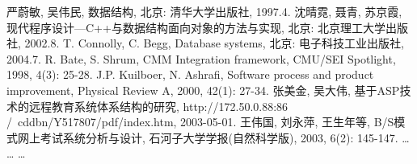 \documentclass[../../main.tex]{subfiles}
\begin{document}
%
















\pagestyle{afterbody}
{}

\begin{thebibliography}{99}

 严蔚敏, 吴伟民, 数据结构, 北京: 清华大学出版社, 1997.4.
 沈晴霓, 聂青, 苏京霞, 现代程序设计—C++与数据结构面向对象的方法与实现, 北京: 北京理工大学出版社, 2002.8.
 T. Connolly, C. Begg, Database systems, 北京: 电子科技工业出版社, 2004.7.
 R. Bate, S. Shrum, CMM Integration framework, CMU/SEI Spotlight, 1998, 4(3): 25-28.
 J.P. Kuilboer, N. Ashrafi, Software process and product improvement, Physical Review A, 2000, 42(1): 27-34.
 张美金, 吴大伟, 基于ASP技术的远程教育系统体系结构的研究, http://172.50.0.88:86 /~cddbn/Y517807/pdf/index.htm, 2003-05-01.
 王伟国, 刘永萍, 王生年等, B/S模式网上考试系统分析与设计, 石河子大学学报(自然科学版), 2003, 6(2): 145-147.
 …
 …
 …
\end{thebibliography}
\end{document}
